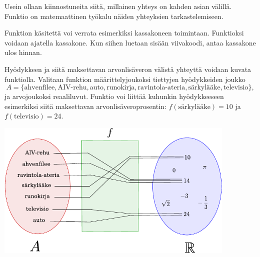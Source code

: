 Usein ollaan kiinnostuneita siitä, millainen yhteys on kahden asian välillä.
Funktio on matemaattinen työkalu näiden yhteyksien tarkastelemiseen.


Funktion käsitettä voi verrata esimerkiksi kassakoneen toimintaan. Funktioksi voidaan ajatella kassakone. Kun siihen luetaan sisään viivakoodi, antaa kassakone ulos hinnan.

\begin{esimerkki}
	Hyödykkeen ja siitä maksettavan arvonlisäveron välistä yhteyttä voidaan kuvata funktiolla.
	Valitaan funktion määrittelyjoukoksi tiettyjen hyödykkeiden joukko
		\[ A = \{\text{ahvenfilee}, \text{AIV-rehu}, \text{auto}, \text{runokirja},
		\text{ravintola-ateria}, \text{särkylääke}, \text{televisio}\}, \]
	ja arvojoukoksi reaaliluvut.
	Funktio voi liittää kuhunkin hyödykkeeseen esimerkiksi siitä maksettavan arvonlisäveroprosentin:
	$f(\text{särkylääke}) = 10$ ja $f(\text{televisio}) = 24$.

	\begin{center}
		\includegraphics[width=11.5cm]{pictures/funktiokone.pdf}
	\end{center}
\end{esimerkki}


